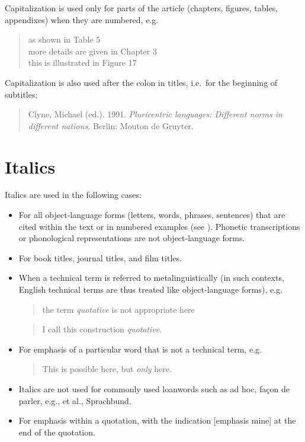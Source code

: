 \documentclass[a4paper]{article}
\newenvironment{gsrexq}{\begin{quote}\color{blue}}{\end{quote}}
\newcommand{\gsrex}[1]{{\color{blue}#1}}
\begin{document}
Capitalization is used only for parts of the article (chapters, figures,
tables, appendixes) when they are numbered, e.g.

\begin{gsrexq}
  as shown in Table 5\\
  more details are given in Chapter 3\\
  this is illustrated in Figure 17\\
\end{gsrexq}


Capitalization is also used after the colon in titles, i.e.~for the
beginning of subtitles: 

\begin{gsrexq} 
  Clyne, Michael (ed.). 1991. \textit{Pluricentric languages: Different norms in different nations.} Berlin: Mouton de Gruyter.
\end{gsrexq}


\section{Italics}\label{sec:italics}

Italics are used in the following cases:
\begin{itemize}
\item For all object-language forms (letters, words, phrases, sentences) that are cited within the text or in numbered examples (see ). Phonetic transcriptions or phonological representations are not object-language forms.
\item For book titles, journal titles, and film titles.
\item When a technical term is referred to metalinguistically (in such contexts, English technical terms are thus treated like object-language forms), e.g.
  \begin{gsrexq}
    the term \textit{quotative} is not appropriate here
  \end{gsrexq} 
  \begin{gsrexq}
    I call this construction \textit{quotative}.
  \end{gsrexq}
\item For emphasis of a particular word that is not a technical term, e.g.
  \begin{gsrexq}
    This is possible here, but \textit{only} here.
  \end{gsrexq} 
\item Italics are not used for commonly used loanwords such as \gsrex{ad hoc}, \gsrex{façon de parler}, \gsrex{e.g.}, \gsrex{et al.}, \gsrex{Sprachbund}.
\item For emphasis within a quotation, with the indication [emphasis mine] at the end of the quotation.
\end{itemize}
\end{document}
